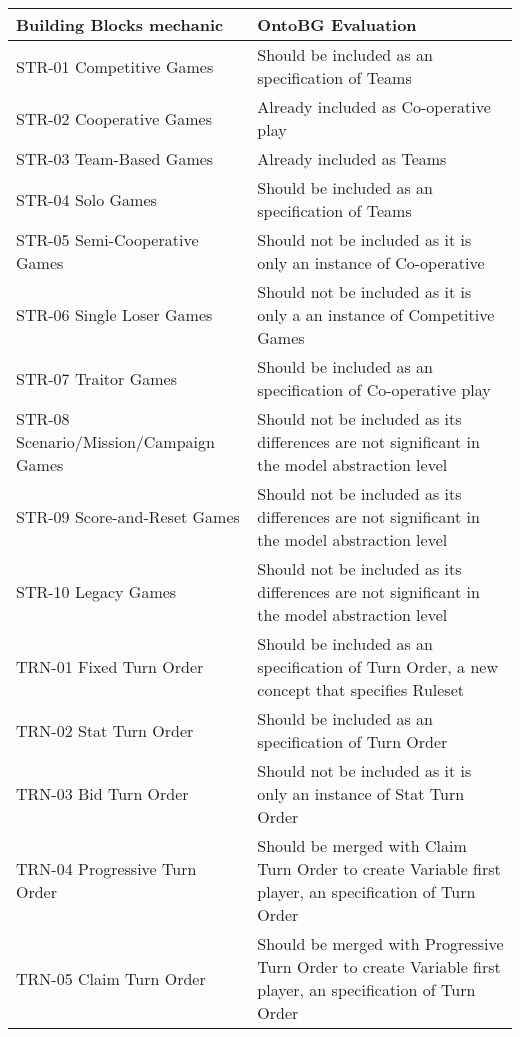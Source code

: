     \begin{longtable}{|m{7cm}|m{7cm}|}
        \hline
        Building Blocks mechanic & OntoBG Evaluation \\
        \hline
        STR-01 Competitive Games & Should be included as an specification of Teams\\
        \hline
        STR-02 Cooperative Games & Already included as Co-operative play \\
        \hline
        STR-03 Team-Based Games & Already included as Teams \\
        \hline
        STR-04 Solo Games & Should be included as an specification of Teams \\
        \hline
        STR-05 Semi-Cooperative Games & Should not be included as it is only an instance of Co-operative  \\
        \hline
        STR-06 Single Loser Games & Should not be included as it is only a an instance of Competitive Games \\
        \hline
        STR-07 Traitor Games & Should be included as an specification of Co-operative play \\
        \hline
        STR-08 Scenario/Mission/Campaign Games & Should not be included as its differences are not significant in the model abstraction level \\
        \hline
        STR-09 Score-and-Reset Games & Should not be included as its differences are not significant in the model abstraction level \\
        \hline
        STR-10 Legacy Games & Should not be included as its differences are not significant in the model abstraction level \\
        \hline
        TRN-01 Fixed Turn Order & Should be included as an specification of Turn Order, a new concept that specifies Ruleset  \\
        \hline
        TRN-02 Stat Turn Order & Should be included as an specification of Turn Order \\
        \hline
        TRN-03 Bid Turn Order & Should not be included as it is only an instance of Stat Turn Order \\
        \hline
        TRN-04 Progressive Turn Order & Should be merged with Claim Turn Order to create Variable first player, an specification of Turn Order\\
        \hline
        TRN-05 Claim Turn Order & Should be merged with Progressive Turn Order to create Variable first player, an specification of Turn Order \\

\end{longtable}
